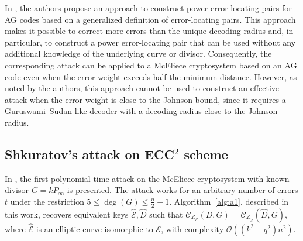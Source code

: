 \documentclass[sn-mathphys-num]{sn-jnl_modified}
\begin{document}
In \cite{PELP}, the authors propose an approach to construct power error-locating pairs for AG codes based on a generalized definition of error-locating pairs. This approach makes it possible to correct more errors than the unique decoding radius and, in particular, to construct a power error-locating pair that can be used without any additional knowledge of the underlying curve or divisor. Consequently, the corresponding attack can be applied to a McEliece cryptosystem based on an AG code even when the error weight exceeds half the minimum distance. However, as noted by the authors, this approach cannot be used to construct an effective attack when the error weight is close to the Johnson bound, since it requires a Guruswami--Sudan-like decoder with a decoding radius close to the Johnson radius.



\subsection{Shkuratov's attack on ECC$^2$ scheme \cite{Sh25}}\label{sec:sh25}

In \cite{Sh25}, the first polynomial-time attack on the McEliece cryptosystem with known divisor $G = kP_\infty$ is presented. The attack works for an arbitrary number of errors $t$ under the restriction $5 \leq \deg(G) \leq \frac{n}{2} - 1$. Algorithm~\ref{alg:a1}, described in this work, recovers equivalent keys $\widehat{\mathcal{E}}, \widehat{D}$ such that $\mathcal{C}_{\mathscr{L}_{\mathcal{E}}}(D, G) = \mathcal{C}_{\mathscr{L}_{\widehat{\mathcal{E}}}}(\widehat{D}, G)$, where $\widehat{\mathcal{E}}$ is an elliptic curve isomorphic to $\mathcal{E}$, with complexity $\mathcal{O}((k^2+q^2)n^2)$.
\end{document}
